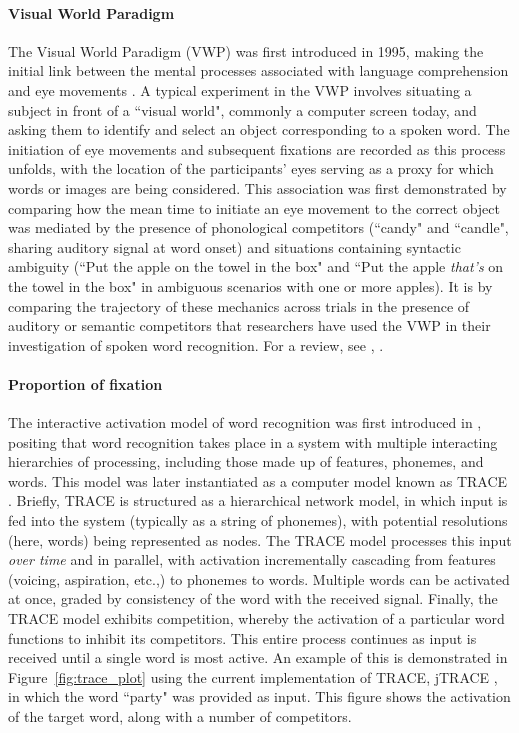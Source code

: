 
\paragraph{Visual World Paradigm} The Visual World Paradigm (VWP) was first introduced in 1995, making the initial link between the mental processes associated with language comprehension and eye movements \citep{tanenhaus1995integration}. A typical experiment in the VWP involves situating a subject in front of a ``visual world", commonly a computer screen today, and asking them to identify and select an object corresponding to a spoken word. The initiation of eye movements and subsequent fixations are recorded as this process unfolds, with the location of the participants' eyes serving as a proxy for which words or images are being considered. This association was first demonstrated by comparing how the mean time to initiate an eye movement to the correct object was mediated by the presence of phonological competitors (``candy" and ``candle", sharing auditory signal at word onset) and situations containing syntactic ambiguity (``Put the apple on the towel in the box" and ``Put the apple \textit{that's} on the towel in the box" in ambiguous scenarios with one or more apples). It is by comparing the trajectory of these mechanics across trials in the presence of auditory or semantic competitors that researchers have used the VWP in their investigation of spoken word recognition. For a review, see \citet{Huettig2011}, \citet{salverda2017visual}.




\paragraph{Proportion of fixation} The interactive activation model of word recognition was first introduced in \citet{McClelland1981}, positing that word recognition takes place in a system with multiple interacting hierarchies of processing, including those made up of features, phonemes, and words. This model was later instantiated as a computer model known as TRACE \citep{elman1985speech}. Briefly, TRACE is structured as a hierarchical network model, in which input is fed into the system (typically as a string of phonemes), with potential resolutions (here, words) being represented as nodes. The TRACE model processes this input \textit{over time} and in parallel, with activation incrementally cascading from features (voicing, aspiration, etc.,) to phonemes to words. Multiple words can be activated at once, graded by consistency of the word with the received signal. Finally, the TRACE model exhibits competition, whereby the activation of a particular word functions to inhibit its competitors. This entire process continues as input is received until a single word is most active. An example of this is demonstrated in Figure~\ref{fig:trace_plot} using the current implementation of TRACE, jTRACE \citep{Strauss2007}, in which the word ``party" was provided as input. This figure shows the activation of the target word, along with a number of competitors.


